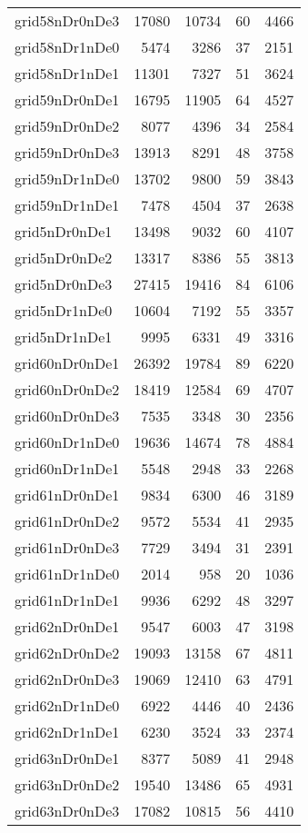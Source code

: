 \begin{tabular}{lrrrr}
grid58nDr0nDe3 & 17080 & 10734 & 60 & 4466 \\
grid58nDr1nDe0 & 5474 & 3286 & 37 & 2151 \\
grid58nDr1nDe1 & 11301 & 7327 & 51 & 3624 \\
grid59nDr0nDe1 & 16795 & 11905 & 64 & 4527 \\
grid59nDr0nDe2 & 8077 & 4396 & 34 & 2584 \\
grid59nDr0nDe3 & 13913 & 8291 & 48 & 3758 \\
grid59nDr1nDe0 & 13702 & 9800 & 59 & 3843 \\
grid59nDr1nDe1 & 7478 & 4504 & 37 & 2638 \\
grid5nDr0nDe1 & 13498 & 9032 & 60 & 4107 \\
grid5nDr0nDe2 & 13317 & 8386 & 55 & 3813 \\
grid5nDr0nDe3 & 27415 & 19416 & 84 & 6106 \\
grid5nDr1nDe0 & 10604 & 7192 & 55 & 3357 \\
grid5nDr1nDe1 & 9995 & 6331 & 49 & 3316 \\
grid60nDr0nDe1 & 26392 & 19784 & 89 & 6220 \\
grid60nDr0nDe2 & 18419 & 12584 & 69 & 4707 \\
grid60nDr0nDe3 & 7535 & 3348 & 30 & 2356 \\
grid60nDr1nDe0 & 19636 & 14674 & 78 & 4884 \\
grid60nDr1nDe1 & 5548 & 2948 & 33 & 2268 \\
grid61nDr0nDe1 & 9834 & 6300 & 46 & 3189 \\
grid61nDr0nDe2 & 9572 & 5534 & 41 & 2935 \\
grid61nDr0nDe3 & 7729 & 3494 & 31 & 2391 \\
grid61nDr1nDe0 & 2014 & 958 & 20 & 1036 \\
grid61nDr1nDe1 & 9936 & 6292 & 48 & 3297 \\
grid62nDr0nDe1 & 9547 & 6003 & 47 & 3198 \\
grid62nDr0nDe2 & 19093 & 13158 & 67 & 4811 \\
grid62nDr0nDe3 & 19069 & 12410 & 63 & 4791 \\
grid62nDr1nDe0 & 6922 & 4446 & 40 & 2436 \\
grid62nDr1nDe1 & 6230 & 3524 & 33 & 2374 \\
grid63nDr0nDe1 & 8377 & 5089 & 41 & 2948 \\
grid63nDr0nDe2 & 19540 & 13486 & 65 & 4931 \\
grid63nDr0nDe3 & 17082 & 10815 & 56 & 4410 \\

\end{tabular}
